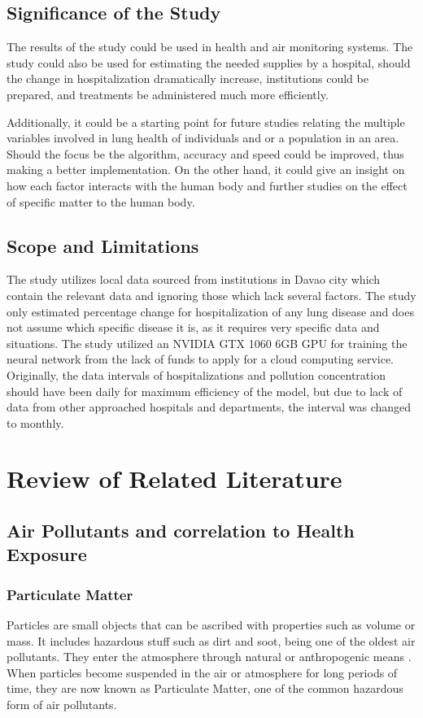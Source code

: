 \documentclass[10pt,11pt,12pt,oneside]{book}
\begin{document}
    \section{Significance of the Study}
    The results of the study could be used in health and air monitoring systems. The study could also be used for estimating the needed supplies by a hospital, should the change in hospitalization dramatically increase, institutions could be prepared, and treatments be administered much more efficiently.
    
    Additionally, it could be a starting point for future studies relating the multiple variables involved in lung health of individuals and or a population in an area. Should the focus be the algorithm, accuracy and speed could be improved, thus making a better implementation. On the other hand, it could give an insight on how each factor interacts with the human body and further studies on the effect of specific matter to the human body.
    \section{Scope and Limitations}
    The study utilizes local data sourced from institutions in Davao city which contain the relevant data and ignoring those which lack several factors. The study only estimated percentage change for hospitalization of any lung disease and does not assume which specific disease it is, as it requires very specific data and situations. The study utilized an NVIDIA GTX 1060 6GB GPU for training the neural network from the lack of funds to apply for a cloud computing service.\\
    
    Originally, the data intervals of hospitalizations and pollution concentration should have been daily for maximum efficiency of the model, but due to lack of data from other approached hospitals and departments, the interval was changed to monthly.
\chapter{Review of Related Literature}
    \section{Air Pollutants and correlation to Health Exposure}
        \subsection{Particulate Matter}
        Particles are small objects that can be ascribed with properties such as volume or mass. It includes hazardous stuff such as dirt and soot, being one of the oldest air pollutants. They enter the atmosphere through natural or anthropogenic means \cite{knudsen2012particulate}. When particles become suspended in the air or atmosphere for long periods of time, they are now known as Particulate Matter, one of the common hazardous form of air pollutants. 
        
\end{document}
